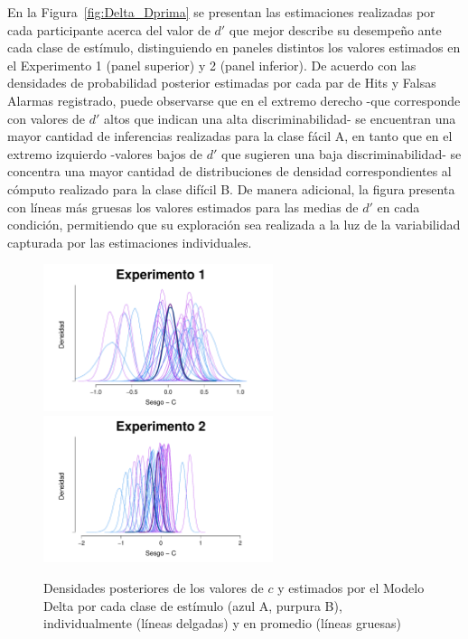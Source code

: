 En la Figura~\ref{fig:Delta_Dprima} se presentan las estimaciones realizadas por cada participante acerca del valor de $d'$ que mejor describe su desempeño ante cada clase de estímulo, distinguiendo en paneles distintos los valores estimados en el Experimento 1 (panel superior) y 2 (panel inferior). De acuerdo con las densidades de probabilidad posterior estimadas por cada par de Hits y Falsas Alarmas registrado, puede observarse que en el extremo derecho -que corresponde con valores de $d'$ altos que indican una alta discriminabilidad- se encuentran una mayor cantidad de inferencias realizadas para la clase fácil A, en tanto que en el extremo izquierdo -valores bajos de $d'$ que sugieren una baja discriminabilidad- se concentra una mayor cantidad de distribuciones de densidad correspondientes al cómputo realizado para la clase difícil B. De manera adicional, la figura presenta con líneas más gruesas los valores estimados para las medias de $d'$ en cada condición, permitiendo que su exploración sea realizada a la luz de la variabilidad capturada por las estimaciones individuales.\\

\begin{figure}[th]
\centering
\includegraphics[width=0.6\textwidth]{Figures/MDelta_Cbias_E1}\\
\includegraphics[width=0.6\textwidth]{Figures/MDelta_Cbias_E2}\\
\caption[Modelo Delta: Densidades posteriores de los valores de $c$ estimados individualmente y en promedio, por experimento]{Densidades posteriores de los valores de $c$ y estimados por el Modelo Delta por cada clase de estímulo (azul A, purpura B), individualmente (líneas delgadas) y en promedio (líneas gruesas)}
\label{fig:Delta_Cbias}
\end{figure}


